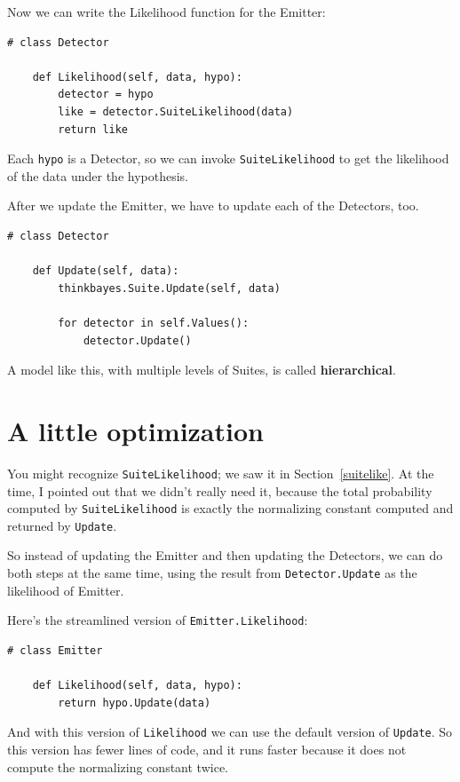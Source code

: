 \documentclass[12pt]{book}
\begin{document}
Now we can write the Likelihood function for the Emitter:

\begin{verbatim}
# class Detector

    def Likelihood(self, data, hypo):
        detector = hypo
        like = detector.SuiteLikelihood(data)
        return like
\end{verbatim}

Each {\tt hypo} is a Detector, so we can invoke
{\tt SuiteLikelihood} to get the likelihood of the data under
the hypothesis.

After we update the Emitter, we have to update each of the
Detectors, too.  

\begin{verbatim}
# class Detector

    def Update(self, data):
        thinkbayes.Suite.Update(self, data)
        
        for detector in self.Values():
            detector.Update()
\end{verbatim}

A model like this, with multiple levels of Suites, is called {\bf
  hierarchical}.  


\section{A little optimization}

You might recognize {\tt SuiteLikelihood}; we saw it
in Section~\ref{suitelike}.  At the time, I pointed out that
we didn't really need it, because the total probability
computed by {\tt SuiteLikelihood} is exactly the normalizing
constant computed and returned by {\tt Update}.
 
So instead of updating the Emitter and then updating the
Detectors, we can do both steps at the same time, using
the result from {\tt Detector.Update} as the likelihood
of Emitter.

Here's the streamlined version of {\tt Emitter.Likelihood}:

\begin{verbatim}
# class Emitter

    def Likelihood(self, data, hypo):
        return hypo.Update(data)
\end{verbatim}

And with this version of {\tt Likelihood} we can use the
default version of {\tt Update}.  So this version has fewer
lines of code, and it runs faster because it does not compute
the normalizing constant twice.
\end{document}
